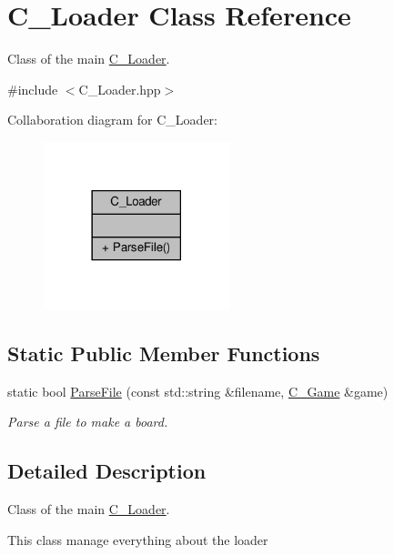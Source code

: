 \hypertarget{classC__Loader}{}\section{C\+\_\+\+Loader Class Reference}
\label{classC__Loader}


Class of the main \hyperlink{classC__Loader}{C\+\_\+\+Loader}.  




{\ttfamily \#include $<$C\+\_\+\+Loader.\+hpp$>$}



Collaboration diagram for C\+\_\+\+Loader\+:
\nopagebreak
\begin{figure}[H]
\begin{center}
\leavevmode
\includegraphics[width=153pt]{classC__Loader__coll__graph}
\end{center}
\end{figure}
\subsection*{Static Public Member Functions}
\begin{DoxyCompactItemize}
\item 
static bool \hyperlink{classC__Loader_a7a6f0089933a6108eb92390afe0ead80}{Parse\+File} (const std\+::string \&filename, \hyperlink{classC__Game}{C\+\_\+\+Game} \&game)
\begin{DoxyCompactList}\small\item\em Parse a file to make a board. \end{DoxyCompactList}\end{DoxyCompactItemize}


\subsection{Detailed Description}
Class of the main \hyperlink{classC__Loader}{C\+\_\+\+Loader}. 

This class manage everything about the loader 

